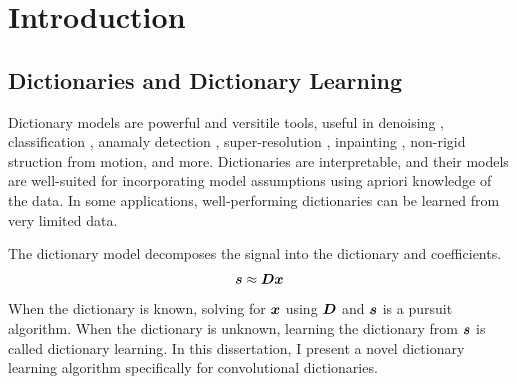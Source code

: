 \chapter{Introduction}


\section{Dictionaries and Dictionary Learning}
Dictionary models are powerful and versitile tools, useful in denoising \cite{wohlberg2016convolutional}, classification \cite{kong2012dictionary}, anamaly detection \cite{carroll2017outlier}, super-resolution \cite{polatkan2014bayesian}\cite{gu2015convolutional}, inpainting \cite{papyan2017convolutional}, non-rigid struction from motion, and more. Dictionaries are interpretable, and their models are well-suited for incorporating model assumptions using apriori knowledge of the data. In some applications, well-performing dictionaries can be learned from very limited data.

The dictionary model decomposes the signal into the dictionary and coefficients.
%
\begin{equation}
\bm{s} \approx \bm{D}\bm{x}
\end{equation}
%
When the dictionary is known, solving for $\bm{x}$ using $\bm{D}$ and $\bm{s}$ is a pursuit algorithm. When the dictionary is unknown, learning the dictionary from $\bm{s}$ is called dictionary learning. In this dissertation, I present a novel dictionary learning algorithm specifically for convolutional dictionaries.

